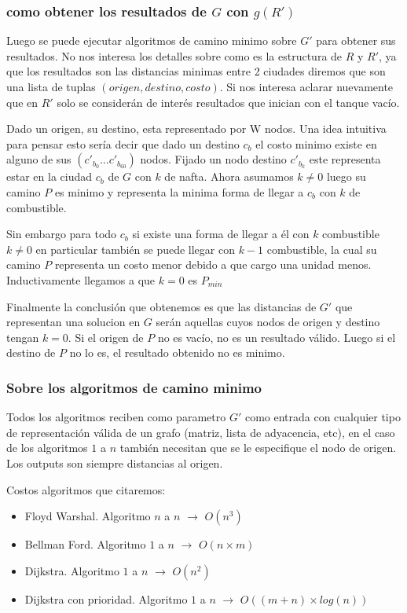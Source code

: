 \documentclass[12pt]{article}
\begin{document}
\subsubsection{como obtener los resultados de $G$ con $g(R')$}

Luego se puede ejecutar algoritmos de camino minimo sobre $G'$ para obtener sus resultados. No nos interesa los detalles sobre como es la estructura de $R$ y $R'$, ya que los resultados son las distancias minimas entre 2 ciudades diremos que son una lista de tuplas $(origen, destino, costo)$. Si nos interesa aclarar nuevamente que en $R'$ solo se considerán de interés resultados que inician con el tanque vacío.

Dado un origen, su destino, esta representado por W nodos. Una idea intuitiva para pensar esto sería decir que dado un destino $c_b$ el costo minimo existe en alguno de sus $(c'_{b_0}...c'_{b_{60}})$ nodos. Fijado un nodo destino $c'_{b_k}$ este representa estar en la ciudad $c_b$ de $G$ con $k$ de nafta. Ahora asumamos $k \neq 0$ luego su camino $P$ es minimo y representa la minima forma de llegar a $c_b$ con $k$ de combustible.

Sin embargo para todo $c_b$ si existe una forma de llegar a él con $k$ combustible $k \neq 0$ en particular también se puede llegar con $k-1$ combustible, la cual su camino $P$ representa un costo menor debido a que cargo una unidad menos. Inductivamente llegamos a que $k=0$ es $P_{min}$

Finalmente la conclusión que obtenemos es que las distancias de $G'$ que representan una solucion en $G$ serán aquellas cuyos nodos de origen y destino tengan $k = 0$. Si el origen de $P$ no es vacío, no es un resultado válido. Luego si el destino de $P$ no lo es, el resultado obtenido no es minimo.

\subsubsection{Sobre los algoritmos de camino minimo}

Todos los algoritmos reciben como parametro $G'$ como entrada con cualquier tipo de representación válida de un grafo (matriz, lista de adyacencia, etc), en el caso de los algoritmos $1$ a $n$ también necesitan que se le especifique el nodo de origen. Los outputs son siempre distancias al origen.

Costos algoritmos que citaremos:
\begin{itemize}
	\item Floyd Warshal. Algoritmo $n$ a $n$ $\rightarrow$  $O(n^3)$
	\item Bellman Ford. Algoritmo $1$ a $n$ $\rightarrow$ $O(n \times m)$
	\item Dijkstra. Algoritmo $1$ a $n$ $\rightarrow$ $O(n^2)$
	\item Dijkstra con prioridad. Algoritmo $1$ a $n$ $\rightarrow$  $O((m + n) \times log (n))$
\end{itemize}
\end{document}
